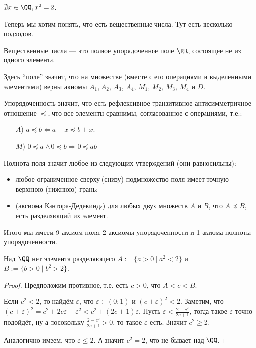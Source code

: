 \documentclass[12pt,a4paper]{article}
\begin{document}
    \begin{theorem}
        $\nexists x\in \QQ, x^2 = 2$.
    \end{theorem}

    Теперь мы хотим понять, что есть вещественные числа. Тут есть несколько подходов.

    \begin{definition}
        Вещественные числа --- это полное упорядоченное поле $\RR$, состоящее не из одного элемента.
        
        Здесь ``поле'' значит, что на множестве (вместе с его операциями и выделенными элементами) верны акиомы $A_1$, $A_2$, $A_3$, $A_4$, $M_1$, $M_2$, $M_3$, $M_4$ и $D$.
        
        Упорядоченность значит, что есть рефлексивное транзитивное антисимметричное отношение $\preccurlyeq$, что все элементы сравнимы, согласованное с операциями, т.е.:
        \begin{itemize}
            \item[$A$)] $a \preccurlyeq b \Leftarrow a + x \preccurlyeq b + x$.
            \item[$M$)] $0 \preccurlyeq a \wedge 0 \preccurlyeq b \Rightarrow 0 \preccurlyeq ab$
        \end{itemize}

        Полнота поля значит любое из следующих утверждений (они равносильны):
        \begin{itemize}
            \item любое ограниченное сверху (снизу) подмножество поля имеет точную верхнюю (нижнюю) грань;
            \item (аксиома Кантора-Дедекинда) для любых двух множеств $A$ и $B$, что $A \preccurlyeq B$, есть разделяющий их элемент.
        \end{itemize}

        Итого мы имеем 9 аксиом поля, 2 аксиомы упорядоченности и 1 акиома полноты упорядоченности.
    \end{definition}

    \begin{statement*}
        Над $\QQ$ нет  элемента разделяющего $A := \{a > 0 \mid a^2 < 2\}$ и $B := \{b > 0 \mid b^2 > 2\}$.
    \end{statement*}

    \begin{proof}
        Предположим противное, т.е. есть $c > 0$, что $A < c < B$.

        Если $c^2 < 2$, то найдём $\varepsilon$, что $\varepsilon \in (0; 1)$ и $(c + \varepsilon)^2 < 2$. Заметим, что $(c + \varepsilon)^2 = c^2 + 2c\varepsilon + \varepsilon^2 < c^2 + (2c + 1)\varepsilon$. Пусть $\varepsilon < \frac{2 - c^2}{2c+ 1}$, тогда такое $\varepsilon$ точно подойдёт, ну а посокольку $\frac{2 - c^2}{2c + 1} > 0$, то такое $\varepsilon$ есть. Значит $c^2 \geqslant 2$.
        
        Аналогично имеем, что $\varepsilon \leqslant 2$. А значит $c^2 = 2$, что не бывает над $\QQ$.
    \end{proof}
\end{document}
